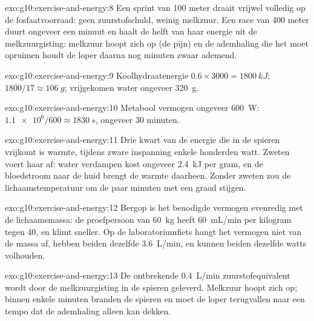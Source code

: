\begin{solution}{exo:g10:exercise-and-energy:8}
Een sprint van 100 meter draait vrijwel volledig op de fosfaatvoorraad:
geen zuurstofschuld, weinig melkzuur. Een race van 400 meter duurt
ongeveer een minuut en haalt de helft van haar energie uit de
melkzuurgisting: melkzuur hoopt zich op (de pijn) en de ademhaling die
het moet opruimen houdt de loper daarna nog minuten zwaar ademend.
\end{solution}

\begin{solution}{exo:g10:exercise-and-energy:9}
Koolhydraatenergie $0.6 \times 3000 = \qty{1800}{kJ}$; 
$1800/17 \approx \qty{106}{g}$; vrijgekomen water ongeveer \qty{320}{g}.
\end{solution}

\begin{solution}{exo:g10:exercise-and-energy:10}
Metabool vermogen ongeveer \qty{600}{W}: $\num{1.1e6}/600 \approx
\qty{1830}{s}$, ongeveer 30 minuten.
\end{solution}

\begin{solution}{exo:g10:exercise-and-energy:11}
Drie kwart van de energie die in de spieren vrijkomt is warmte, tijdens
zware inspanning enkele honderden watt. Zweten voert haar af: water
verdampen kost ongeveer \qty{2.4}{kJ} per gram, en de bloedstroom naar
de huid brengt de warmte daarheen. Zonder zweten zou de
lichaamstemperatuur om de paar minuten met een graad stijgen.
\end{solution}

\begin{solution}{exo:g10:exercise-and-energy:12}
Bergop is het benodigde vermogen evenredig met de lichaamsmassa: de
proefpersoon van \qty{60}{kg} heeft \qty{60}{mL/min} per kilogram tegen
\num{40}, en klimt sneller. Op de laboratoriumfiets hangt het vermogen
niet van de massa af, hebben beiden dezelfde \qty{3.6}{L/min}, en kunnen
beiden dezelfde watts volhouden.
\end{solution}

\begin{solution}{exo:g10:exercise-and-energy:13}
De ontbrekende \qty{0.4}{L/min} zuurstofequivalent wordt door de
melkzuurgisting in de spieren geleverd. Melkzuur hoopt zich op; binnen
enkele minuten branden de spieren en moet de loper terugvallen naar een
tempo dat de ademhaling alleen kan dekken.
\end{solution}


